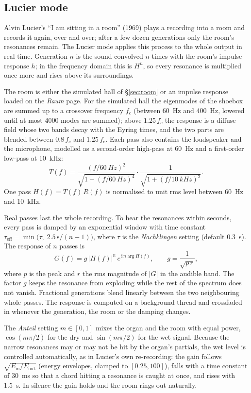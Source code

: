 \documentclass[11pt,a4paper,parskip=half,DIV=11,toc=bibliography]{scrartcl}
\newcommand{\ui}[1]{\emph{#1}}                 %
\begin{document}
\subsection{Lucier mode}
\label{sec:lucier}
Alvin Lucier's \enquote{I am sitting in a room} (1969) plays a recording into a room and records it again,
over and over; after a few dozen generations only the room's resonances remain. The Lucier mode applies this
process to the whole output in real time. Generation $n$ is the sound convolved $n$ times with the room's
impulse response $h$; in the frequency domain this is $H^n$, so every resonance is multiplied once more and
rises above its surroundings.

The room is either the simulated hall of \S\ref{sec:room} or an impulse response loaded on the \ui{Raum}
page. For the simulated hall the eigenmodes of the shoebox are summed up to a crossover frequency $f_c$
(between \SI{60}{Hz} and \SI{400}{Hz}, lowered until at most 4000 modes are summed); above $1.25\,f_c$ the
response is a diffuse field whose two bands decay with the Eyring times, and the two parts are blended
between $0.8\,f_c$ and $1.25\,f_c$. Each pass also contains the loudspeaker and the microphone, modelled as a
second-order high-pass at \SI{60}{Hz} and a first-order low-pass at \SI{10}{kHz}:
\begin{equation}
  T(f) = \frac{(f/\SI{60}{Hz})^2}{\sqrt{1+(f/\SI{60}{Hz})^4}}\cdot\frac{1}{\sqrt{1+(f/\SI{10}{kHz})^2}} .
\end{equation}
One pass $H(f)=T(f)\,R(f)$ is normalised to unit rms level between \SI{60}{Hz} and \SI{10}{kHz}.

Real passes last the whole recording. To hear the resonances within seconds, every pass is damped by an
exponential window with time constant $\tau_{\mathrm{eff}}=\min\bigl(\tau,\;2.5\,\mathrm{s}/(n-1)\bigr)$, where
$\tau$ is the \ui{Nachklingen} setting (default \SI{0.3}{s}). The response of $n$ passes is
\begin{equation}
  G(f) = g\,|H(f)|^{n}\,e^{\,\mathrm{i}\,n\arg H(f)},\qquad g=\frac{1}{\sqrt{p\,r}},
\end{equation}
where $p$ is the peak and $r$ the rms magnitude of $|G|$ in the audible band. The factor $g$ keeps the
resonance from exploding while the rest of the spectrum does not vanish. Fractional generations blend
linearly between the two neighbouring whole passes. The response is computed on a background thread and
crossfaded in whenever the generation, the room or the damping changes.

The \ui{Anteil} setting $m\in[0,1]$ mixes the organ and the room with equal power, $\cos(m\pi/2)$ for the
dry and $\sin(m\pi/2)$ for the wet signal. Because the narrow resonances may or may not be hit by the organ's
partials, the wet level is controlled automatically, as in Lucier's own re-recording: the gain follows
$\sqrt{E_{\mathrm{in}}/E_{\mathrm{out}}}$ (energy envelopes, clamped to $[0.25,100]$), falls with a time
constant of \SI{30}{ms} so that a chord hitting a resonance is caught at once, and rises with \SI{1.5}{s}.
In silence the gain holds and the room rings out naturally.
\end{document}
